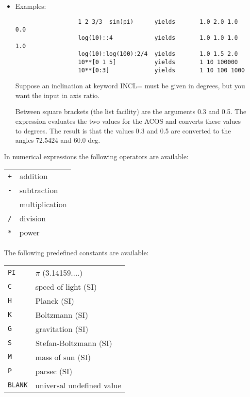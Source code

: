 \begin{itemize}
        \item Examples: \\
                  \begin{verbatim}
                  1 2 3/3  sin(pi)      yields       1.0 2.0 1.0 0.0
                  log(10)::4            yields       1.0 1.0 1.0 1.0
                  log(10):log(100):2/4  yields       1.0 1.5 2.0
                  10**[0 1 5]           yields       1 10 100000
                  10**[0:3]             yields       1 10 100 1000
                  \end{verbatim}
                  Suppose an inclination at keyword INCL= must be given in 
                  degrees, but you want the input in axis ratio.


                  Between square brackets (the list facility) are the 
                  arguments 0.3 and 0.5. The expression evaluates the two
                  values for the ACOS and converts these values to 
                  degrees. The result is that the values 0.3 and 0.5
                  are converted to the angles 72.5424 and 60.0 deg.
\end{itemize}

In numerical expressions the following operators are available:

{\small
\begin{tabular}{ll}
{\tt +}&addition \\
{\tt -}&subtraction \\
{\tt *}&multiplication \\
{\tt /}&division \\
{\tt **}&power \\
\end{tabular}
}

The following predefined constants are available:

{\small
\begin{tabular}{ll}
{\tt PI}&$\pi$ (3.14159....) \\
{\tt C}&speed of light (SI) \\
{\tt H}&Planck (SI) \\
{\tt K}&Boltzmann (SI) \\
{\tt G}&gravitation (SI) \\
{\tt S}&Stefan-Boltzmann (SI) \\
{\tt M}&mass of sun (SI) \\
{\tt P}&parsec (SI) \\
{\tt BLANK}&universal undefined value \\
\end{tabular}
}

